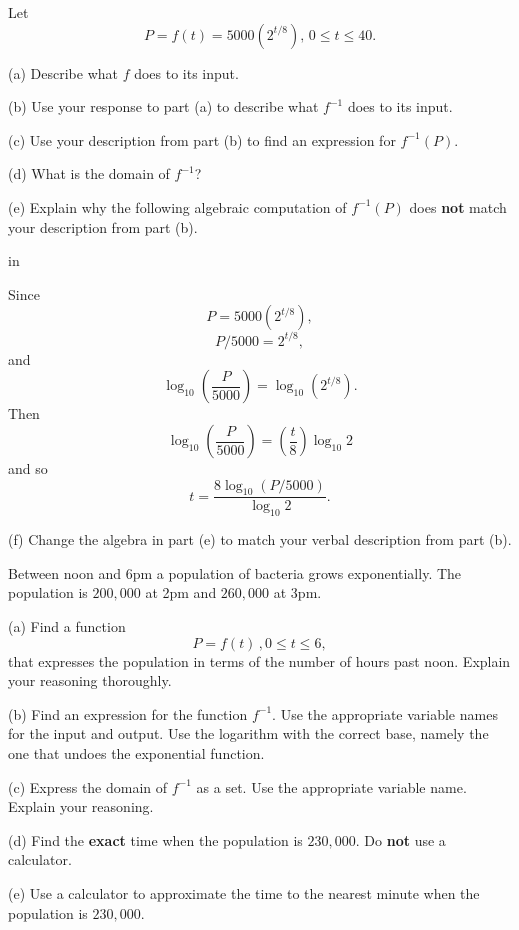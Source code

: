 \documentclass{ximera}
\newcommand{\pskip}{\vskip 0.1 in}
\begin{document}
\begin{question} \label{Q5:LogF}
Let
\[
   P =  f(t) = 5000 (2^{t/8}) , \, 0\leq t \leq 40.
\]

(a) Describe what $f$ does to its input.

(b) Use your response to part (a) to describe what $f^{-1}$ does to its input.

(c) Use your description from part (b) to find an expression for $f^{-1}(P)$. 

(d) What is the domain of $f^{-1}$?

(e) Explain why the following algebraic computation of $f^{-1}(P)$ does {\bf not} match your description from part (b).

\pskip

Since
\[
   P = 5000 (2^{t/8}) ,
\]
\[
   P/5000 = 2^{t/8} ,
\]
and 
\[
   \log_{10}\left( \frac{P}{5000} \right) = \log_{10} (2^{t/8}) .
\]
Then
\[
   \log_{10}\left( \frac{P}{5000} \right) =  \left( \frac{t}{8}  \right)  \log_{10} 2 
\]
and so 
\[
    t = \frac{8 \log_{10}(P/5000)}{\log_{10} 2} .
\]

(f) Change the algebra in part (e) to match your verbal description from part (b).
\end{question}


\begin{question} \label{Q7:LogF}
Between noon and 6pm a population of bacteria grows exponentially. The population is $200,000$ at 2pm and $260,000$ at 3pm.

(a) Find a function 
\[
     P = f(t) \, , 0\leq t \leq 6 ,
\]
that expresses the population in terms of the number of hours past noon. Explain your reasoning thoroughly.

(b) Find an expression for the function $f^{-1}$. Use the appropriate variable names for the input and output. Use the logarithm with the correct base, namely the one that undoes the exponential function.

(c) Express the domain of $f^{-1}$ as a set. Use the appropriate variable name. Explain your reasoning.

(d) Find the {\bf exact} time when the population is $230,000$. Do {\bf not} use a calculator.

(e) Use a calculator to approximate the time to the nearest minute when the population is $230,000$.

\end{question}
\end{document}
